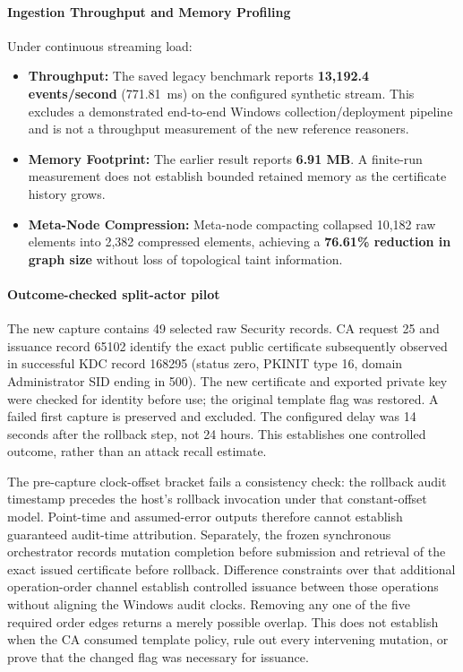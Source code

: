 \paragraph{Ingestion Throughput and Memory Profiling}
Under continuous streaming load:
\begin{itemize}
    \item \textbf{Throughput:} The saved legacy benchmark reports \textbf{13,192.4 events/second} (771.81~ms) on the configured synthetic stream. This excludes a demonstrated end-to-end Windows collection/deployment pipeline and is not a throughput measurement of the new reference reasoners.
    \item \textbf{Memory Footprint:} The earlier result reports \textbf{6.91 MB}. A finite-run measurement does not establish bounded retained memory as the certificate history grows.
    \item \textbf{Meta-Node Compression:} Meta-node compacting collapsed 10,182 raw elements into 2,382 compressed elements, achieving a \textbf{76.61\% reduction in graph size} without loss of topological taint information.
\end{itemize}

\paragraph{Outcome-checked split-actor pilot}
The new capture contains 49 selected raw Security records. CA request 25 and issuance record 65102 identify the exact public certificate subsequently observed in successful KDC record 168295 (status zero, PKINIT type 16, domain Administrator SID ending in 500). The new certificate and exported private key were checked for identity before use; the original template flag was restored. A failed first capture is preserved and excluded. The configured delay was 14 seconds after the rollback step, not 24 hours. This establishes one controlled outcome, rather than an attack recall estimate.

The pre-capture clock-offset bracket fails a consistency check: the rollback audit timestamp precedes the host's rollback invocation under that constant-offset model. Point-time and assumed-error outputs therefore cannot establish guaranteed audit-time attribution. Separately, the frozen synchronous orchestrator records mutation completion before submission and retrieval of the exact issued certificate before rollback. Difference constraints over that additional operation-order channel establish controlled issuance between those operations without aligning the Windows audit clocks. Removing any one of the five required order edges returns a merely possible overlap. This does not establish when the CA consumed template policy, rule out every intervening mutation, or prove that the changed flag was necessary for issuance.

